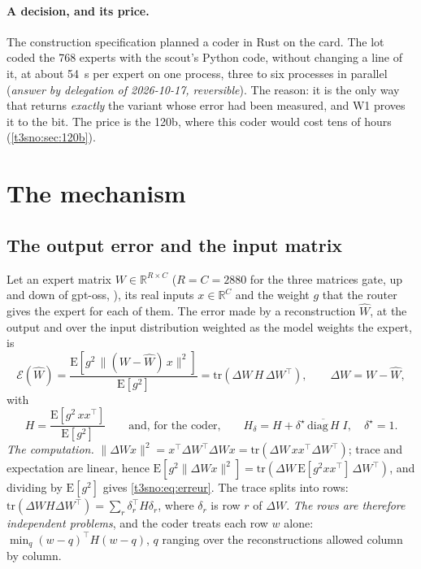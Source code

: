\paragraph{A decision, and its price.} The construction specification planned a coder in Rust on the card. The lot coded the 768 experts with the scout's Python code, without changing a line of it, at about \SI{54}{\second} per expert on one process, three to six processes in parallel (\emph{answer by delegation of 2026-10-17, reversible}). The reason: it is the only way that returns \emph{exactly} the variant whose error had been measured, and W1 proves it to the bit. The price is the 120b, where this coder would cost tens of hours (\cref{t3sno:sec:120b}).

\section{The mechanism}\label{t3sno:sec:mecanisme}

\subsection{The output error and the input matrix}\label{t3sno:sec:H}

Let an expert matrix $W \in \mathbb{R}^{R \times C}$ ($R = C = \num{2880}$ for the three matrices gate, up and down of gpt-oss, \cite{openai2025gptoss}), its real inputs $x \in \mathbb{R}^C$ and the weight $g$ that the router gives the expert for each of them. The error made by a reconstruction $\hat W$, at the output and over the input distribution weighted as the model weights the expert, is
\begin{equation}\label{t3sno:eq:erreur}
\mathcal{E}(\hat W) = \frac{\mathrm{E}\!\left[g^2 \,\lVert (W - \hat W)\, x \rVert^2\right]}{\mathrm{E}[g^2]}
= \mathrm{tr}\!\left(\Delta W \, H \, \Delta W^\top\right),
\qquad \Delta W = W - \hat W,
\end{equation}
with
\begin{equation}\label{t3sno:eq:H}
H = \frac{\mathrm{E}[g^2\, x x^\top]}{\mathrm{E}[g^2]}
\qquad\text{and, for the coder,}\qquad
H_\delta = H + \delta^\star\, \overline{\mathrm{diag}\, H}\; I,\quad \delta^\star = 1 .
\end{equation}
\emph{The computation.} $\lVert \Delta W x\rVert^2 = x^\top \Delta W^\top \Delta W x = \mathrm{tr}(\Delta W\, x x^\top \Delta W^\top)$; trace and expectation are linear, hence $\mathrm{E}[g^2 \lVert \Delta W x\rVert^2] = \mathrm{tr}(\Delta W\, \mathrm{E}[g^2 x x^\top]\, \Delta W^\top)$, and dividing by $\mathrm{E}[g^2]$ gives \eqref{t3sno:eq:erreur}. The trace splits into rows: $\mathrm{tr}(\Delta W H \Delta W^\top) = \sum_r \delta_r^\top H \delta_r$, where $\delta_r$ is row $r$ of $\Delta W$. \emph{The rows are therefore independent problems}, and the coder treats each row $w$ alone: $\min_q (w - q)^\top H (w - q)$, $q$ ranging over the reconstructions allowed column by column.

